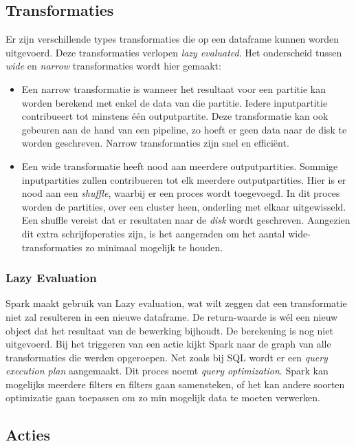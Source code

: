 \documentclass[a4paper,10pt,twoside]{report}
\begin{document}
\subsection{Transformaties}

Er zijn verschillende types transformaties die op een dataframe kunnen worden uitgevoerd. Deze transformaties verlopen \textit{lazy evaluated}. Het onderscheid tussen \textit{wide} en \textit{narrow} transformaties wordt hier gemaakt:

\begin{itemize}
	\item Een narrow transformatie is wanneer het resultaat voor een partitie kan worden berekend met enkel de data van die partitie. Iedere inputpartitie contribueert tot minstens één outputpartite. Deze transformatie kan ook gebeuren aan de hand van een pipeline, zo hoeft er geen data naar de disk te worden geschreven. Narrow transformaties zijn snel en efficiënt.
	\item Een wide transformatie heeft nood aan meerdere outputpartities. Sommige inputpartities zullen contribueren tot elk meerdere outputpartities. Hier is er nood aan een \textit{shuffle}, waarbij er een proces wordt toegevoegd. In dit proces worden de partities, over een cluster heen, onderling met elkaar uitgewisseld. Een shuffle vereist dat er resultaten naar de \textit{disk} wordt geschreven. Aangezien dit extra schrijfoperaties zijn, is het aangeraden om het aantal wide-transformaties zo minimaal mogelijk te houden.
\end{itemize}

\subsubsection{Lazy Evaluation}

Spark maakt gebruik van Lazy evaluation, wat wilt zeggen dat een transformatie niet zal resulteren in een nieuwe dataframe. De return-waarde is wél een nieuw object dat het resultaat van de bewerking bijhoudt. De berekening is nog niet uitgevoerd. Bij het triggeren van een actie kijkt Spark naar de graph van alle transformaties die werden opgeroepen. Net zoals bij SQL wordt er een \textit{query execution plan} aangemaakt. Dit proces noemt \textit{query optimization}. Spark kan mogelijks meerdere filters en filters gaan samensteken, of het kan andere soorten optimizatie gaan toepassen om zo min mogelijk data te moeten verwerken.

\subsection{Acties}
\end{document}

